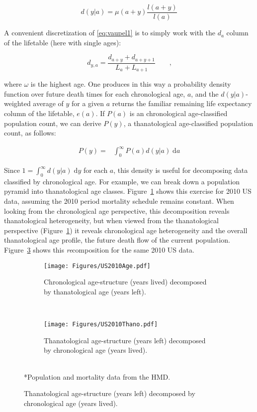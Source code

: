 \documentclass{article}
\newcommand{\dd}{\; \mathrm{d}}
\begin{document}
\begin{equation}
\label{eq:vaupel1}
d(y | a) = \mu(a+y)\frac{l(a+y)}{l(a)}
\end{equation}

A convenient discretization of \eqref{eq:vaupel1} is to simply work with the
$d_a$ column of the lifetable (here with single ages):

\begin{equation}
d_{y, a} =  \frac{d_{a+y}+d_{a+y+1}}{L_a + L_{a+1}} \quad\quad \text{,}
\end{equation}

\noindent where $\omega$ is the highest age. One
produces in this way a probability density function over future death times
for each chronological age, $a$, and the $d(y|a)$- weighted average of $y$ for
a given $a$ returns the familiar remaining life expectancy column of the lifetable,
$e(a)$. If $P(a)$ is an chronological age-classified population count,
we can derive $P(y)$, a thanatological age-classified population count, as
follows:

\begin{align}
\label{eq:transform}
P(y) =& \int_0^\infty P(a) d(y | a) \dd a
\end{align}

Since $1 = \int_0^\infty d(y|a) \dd y$ for each $a$,
this density is useful for decomposing data classified by chronological age. For
example, we can break down a population pyramid into thanatological age classes.
Figure~\ref{fig:USdecomp} shows this exercise for 2010 US data, assuming the
2010 period mortality schedule remains constant. When looking from the
chronological age perspective, this decomposition reveals thanatological
heterogeneity, but when viewed from the thanatological perspective
(Figure~\ref{fig:USdecomp}) it reveals chronological age heterogeneity and the
overall thanatological age profile, the future death flow of the current
population.
Figure~\ref{fig:USrecomp} shows this \textit{re}composition for the same 2010
US data.

\begin{figure}[ht!]
	\caption{2010 US population structure}
	\begin{center}
	\begin{subfigure}{.45\textwidth}
		\caption{Chronological age-structure (years lived) decomposed by
		thanatological age (years left).}
		\label{fig:USdecomp}
		\texttt{[image: Figures/US2010Age.pdf]}
	\end{subfigure}
	~
	\begin{subfigure}{.45\textwidth}
		\caption{Thanatological age-structure (years left) decomposed by chronological
		age (years lived).}
		\label{fig:USrecomp}
		\texttt{[image: Figures/US2010Thano.pdf]}
	\end{subfigure}
	\\
	\small{*Population and mortality data from the HMD.}
	\end{center}
\end{figure}
\end{document}
